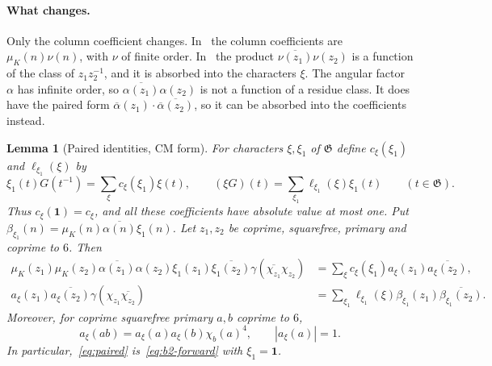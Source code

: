 \documentclass[11pt]{article}
\numberwithin{equation}{section}
\newcommand{\muk}{\mu_K}
\newtheorem{lemma}{Lemma}
\begin{document}
\paragraph{What changes.} Only the column coefficient changes. In~\cite{OAI1112} the column
coefficients are $\muk(n)\nu(n)$, with $\nu$ of finite order. In~\cite[(4.15)]{OAI1112} the
product $\overline{\nu(z_1)}\nu(z_2)$ is a function of the class of $z_1z_2^{-1}$, and it is
absorbed into the characters $\xi$. The angular factor $\alpha$ has infinite order, so
$\overline{\alpha(z_1)}\alpha(z_2)$ is not a function of a residue class. It does have the
paired form $\overline\alpha(z_1)\cdot\overline{\overline\alpha(z_2)}$, so it can be absorbed
into the coefficients instead.

\begin{lemma}[Paired identities, CM form]\label{lem:b2-paired}
For characters $\xi,\xi_1$ of $\mathfrak G$ define $c_\xi(\xi_1)$ and $\ell_{\xi_1}(\xi)$ by
\begin{equation}\label{eq:d039}
 \xi_1(t)G(t^{-1})=\sum_\xi c_\xi(\xi_1)\xi(t),\qquad
 (\xi G)(t)=\sum_{\xi_1}\ell_{\xi_1}(\xi)\xi_1(t)\qquad(t\in\mathfrak G).
\end{equation}
Thus $c_\xi(\mathbf1)=c_\xi$, and all these coefficients have absolute value at most one.
Put $\beta_{\xi_1}(n)=\muk(n)\overline{\alpha(n)}\xi_1(n)$. Let $z_1,z_2$ be coprime,
squarefree, primary and coprime to $6$. Then
\begin{align}
 \muk(z_1)\muk(z_2)\overline{\alpha(z_1)}\alpha(z_2)\xi_1(z_1)\overline{\xi_1(z_2)}
 \gamma(\overline{\chi_{z_1}}\chi_{z_2})
 &=\sum_\xi c_\xi(\xi_1)a_\xi(z_1)\overline{a_\xi(z_2)},\label{eq:b2-forward}\\
 a_\xi(z_1)\overline{a_\xi(z_2)}\gamma(\chi_{z_1}\overline{\chi_{z_2}})
 &=\sum_{\xi_1}\ell_{\xi_1}(\xi)\beta_{\xi_1}(z_1)\overline{\beta_{\xi_1}(z_2)}.
 \label{eq:b2-reverse}
\end{align}
Moreover, for coprime squarefree primary $a,b$ coprime to $6$,
\begin{equation}\label{eq:b2-twisted}
 a_\xi(ab)=a_\xi(a)a_\xi(b)\chi_b(a)^4,\qquad |a_\xi(a)|=1.
\end{equation}
In particular,~\eqref{eq:paired} is~\eqref{eq:b2-forward} with $\xi_1=\mathbf1$.
\end{lemma}
\end{document}
